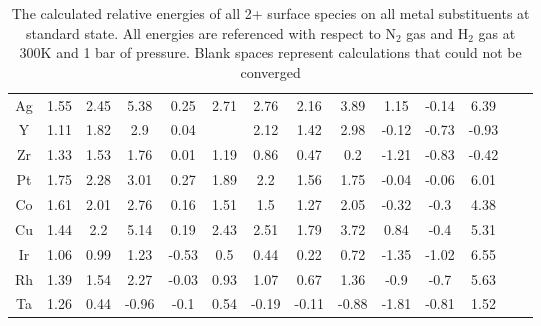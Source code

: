 \documentclass{article}
\begin{document}
\begin{table}
\begin{center}
\begin{tabular}{| c | c | c | c | c | c | c | c | c | c | c | c | c | c |}
Ag & 1.55 & 2.45 & 5.38 & 0.25 & 2.71 & 2.76 & 2.16 & 3.89 & 1.15 & -0.14 & 6.39 \\
Y & 1.11 & 1.82 & 2.9 & 0.04 &  & 2.12 & 1.42 & 2.98 & -0.12 & -0.73 & -0.93 \\
Zr & 1.33 & 1.53 & 1.76 & 0.01 & 1.19 & 0.86 & 0.47 & 0.2 & -1.21 & -0.83 & -0.42 \\
Pt & 1.75 & 2.28 & 3.01 & 0.27 & 1.89 & 2.2 & 1.56 & 1.75 & -0.04 & -0.06 & 6.01 \\
Co & 1.61 & 2.01 & 2.76 & 0.16 & 1.51 & 1.5 & 1.27 & 2.05 & -0.32 & -0.3 & 4.38 \\
Cu & 1.44 & 2.2 & 5.14 & 0.19 & 2.43 & 2.51 & 1.79 & 3.72 & 0.84 & -0.4 & 5.31 \\
Ir & 1.06 & 0.99 & 1.23 & -0.53 & 0.5 & 0.44 & 0.22 & 0.72 & -1.35 & -1.02 & 6.55 \\
Rh & 1.39 & 1.54 & 2.27 & -0.03 & 0.93 & 1.07 & 0.67 & 1.36 & -0.9 & -0.7 & 5.63 \\
Ta & 1.26 & 0.44 & -0.96 & -0.1 & 0.54 & -0.19 & -0.11 & -0.88 & -1.81 & -0.81 & 1.52 \\
\hline
\end{tabular}
\end{center}
\caption{The calculated relative energies of all 2+ surface species on all metal substituents at standard state. All energies are referenced with respect to N$_2$ gas and H$_2$ gas at 300K and 1 bar of pressure. Blank spaces represent calculations that could not be converged}
\label{table:energies}
\end{table}
\end{document}
